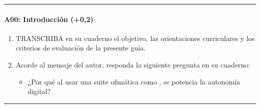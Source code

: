 \documentclass[letterpaper,10pt,spanish]{sphinxmanual}
\begin{document}
\bigskip\hrule\bigskip



\paragraph{A00: Introducción (+0,2)}
\label{\detokenize{cursos/ofimatica10/periodo01/G03:a00-introduccion-0-2}}
\sphinxAtStartPar
{}
\begin{enumerate}
%
\item {} 
\sphinxAtStartPar
TRANSCRIBA en su cuaderno el objetivo, las orientaciones curriculares y los criterios de evaluación de la presente guía.

\item {} 
\sphinxAtStartPar
Acorde al mensaje del autor, responda la siguiente pregunta en su cuaderno:
\begin{itemize}
\item {} 
\sphinxAtStartPar
¿Por qué al usar una suite ofimática como , se potencia la autonomía digital?

\end{itemize}

\end{enumerate}


\bigskip\hrule\bigskip
\end{document}
